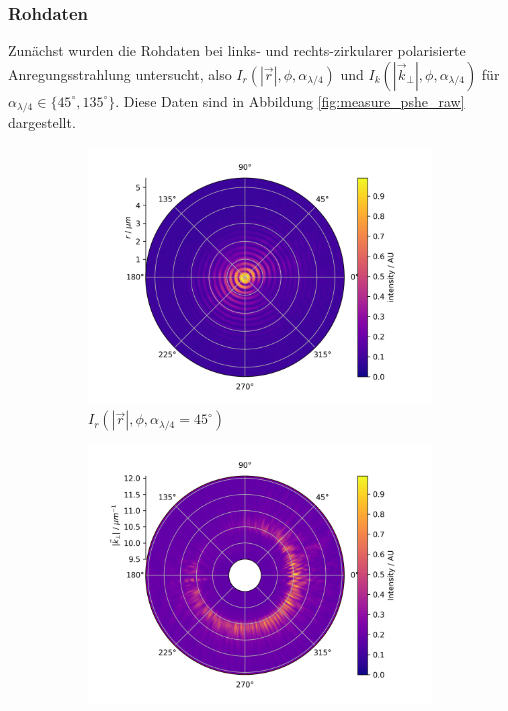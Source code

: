 \documentclass[titlepage,  ngerman]{article}
\begin{document}
	\subsubsection{Rohdaten}
	Zunächst wurden die Rohdaten bei links- und rechts-zirkularer polarisierte Anregungsstrahlung untersucht, also $I_r(|\vec{r}|, \phi, \alpha_{\lambda /4})$ und $I_k(|\vec{k}_\perp|, \phi, \alpha_{\lambda /4})$ für $\alpha_{\lambda /4} \in \{45^\circ, 135^\circ\}$. Diese Daten sind in Abbildung \ref{fig:measure_pshe_raw} dargestellt. 
	\begin{figure}
		\begin{subfigure}[b]{0.49\textwidth}
			\centering
			\includegraphics[width=\textwidth]{figures/fp/fp_45.png}
			\caption{$I_r(|\vec{r}|, \phi, \alpha_{\lambda /4} = 45^\circ)$}
			\label{fig:raw_fp_45}
		\end{subfigure}
		\begin{subfigure}[b]{0.5\textwidth}
			\centering
			\includegraphics[width=\textwidth]{figures/spin_hall/polar/polar_45.png}

\end{subfigure}
\end{figure}
\end{document}
